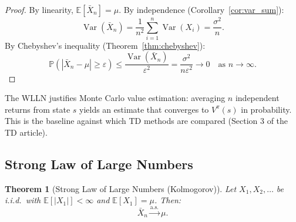 \documentclass[11pt,a4paper]{article}
\theoremstyle{definition}
\theoremstyle{plain}
\newtheorem{theorem}{Theorem}[section]
\theoremstyle{remark}
\DeclareMathOperator{\Var}{Var}
\newcommand{\E}{\mathbb{E}}
\newcommand{\Prob}{\mathbb{P}}
\newcommand{\cas}{\xrightarrow{\text{a.s.}}}
\begin{document}
\begin{proof}
By linearity, $\E[\bar{X}_n] = \mu$. By independence (Corollary~\ref{cor:var_sum}):
\begin{equation}
    \Var(\bar{X}_n) = \frac{1}{n^2} \sum_{i=1}^n \Var(X_i) = \frac{\sigma^2}{n}.
\end{equation}
By Chebyshev's inequality (Theorem~\ref{thm:chebyshev}):
\begin{equation}
    \Prob(|\bar{X}_n - \mu| \geq \varepsilon) \leq \frac{\Var(\bar{X}_n)}{\varepsilon^2} = \frac{\sigma^2}{n\varepsilon^2} \to 0 \quad \text{as } n \to \infty.
\end{equation}
\end{proof}

\begin{rlconnection}[Connection to RL]
The WLLN justifies Monte Carlo value estimation: averaging $n$ independent returns from state $s$ yields an estimate that converges to $V^\pi(s)$ in probability. This is the baseline against which TD methods are compared (Section 3 of the TD article).
\end{rlconnection}

\subsection{Strong Law of Large Numbers}
\label{subsec:slln}

\begin{keyresult}
\begin{theorem}[Strong Law of Large Numbers (Kolmogorov)]
\label{thm:slln}
Let $X_1, X_2, \ldots$ be i.i.d.\ with $\E[|X_1|] < \infty$ and $\E[X_1] = \mu$. Then:
\begin{equation}
    \bar{X}_n \cas \mu.
    \label{eq:slln}
\end{equation}
\end{theorem}
\end{keyresult}
\end{document}
